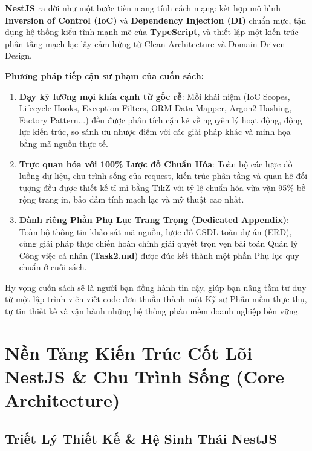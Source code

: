 \documentclass[12pt,a4paper,oneside]{book}
\begin{document}
\textbf{NestJS} ra đời như một bước tiến mang tính cách mạng: kết hợp mô hình \textbf{Inversion of Control (IoC)} và \textbf{Dependency Injection (DI)} chuẩn mực, tận dụng hệ thống kiểu tĩnh mạnh mẽ của \textbf{TypeScript}, và thiết lập một kiến trúc phân tầng mạch lạc lấy cảm hứng từ Clean Architecture và Domain-Driven Design.

\vspace{0.4cm}
\textbf{Phương pháp tiếp cận sư phạm của cuốn sách:}
\begin{enumerate}
  \item \textbf{Dạy kỹ lưỡng mọi khía cạnh từ gốc rễ}: Mỗi khái niệm (IoC Scopes, Lifecycle Hooks, Exception Filters, ORM Data Mapper, Argon2 Hashing, Factory Pattern...) đều được phân tích cặn kẽ về nguyên lý hoạt động, động lực kiến trúc, so sánh ưu nhược điểm với các giải pháp khác và minh họa bằng mã nguồn thực tế.
  \item \textbf{Trực quan hóa với 100\% Lược đồ Chuẩn Hóa}: Toàn bộ các lược đồ luồng dữ liệu, chu trình sống của request, kiến trúc phân tầng và quan hệ đối tượng đều được thiết kế tỉ mỉ bằng TikZ với tỷ lệ chuẩn hóa vừa vặn 95\% bề rộng trang in, bảo đảm tính mạch lạc và mỹ thuật cao nhất.
  \item \textbf{Dành riêng Phần Phụ Lục Trang Trọng (Dedicated Appendix)}: Toàn bộ thông tin khảo sát mã nguồn, lược đồ CSDL toàn dự án (ERD), cùng giải pháp thực chiến hoàn chỉnh giải quyết trọn vẹn bài toán Quản lý Công việc cá nhân (\textbf{Task2.md}) được đúc kết thành một phần Phụ lục quy chuẩn ở cuối sách.
\end{enumerate}

Hy vọng cuốn sách sẽ là người bạn đồng hành tin cậy, giúp bạn nâng tầm tư duy từ một lập trình viên viết code đơn thuần thành một Kỹ sư Phần mềm thực thụ, tự tin thiết kế và vận hành những hệ thống phần mềm doanh nghiệp bền vững.

\newpage
\tableofcontents
\newpage

\part{Nền Tảng Kiến Trúc Cốt Lõi NestJS \& Chu Trình Sống (Core Architecture)}

\chapter{Triết Lý Thiết Kế \& Hệ Sinh Thái NestJS}
\end{document}
